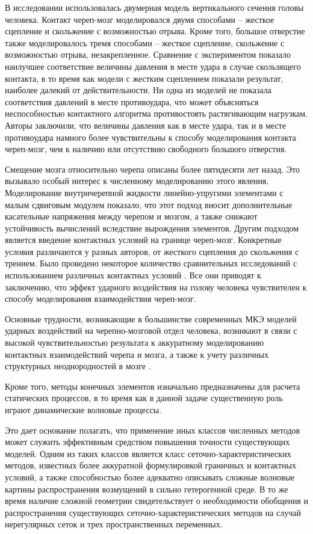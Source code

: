 В исследовании \cite{kuijpers} использовалась двумерная модель вертикального сечения головы человека. Контакт череп-мозг моделировался двумя способами -- жесткое сцепление и скольжение с возможностью отрыва. Кроме того, большое отверстие также моделировалось тремя способами -- жесткое сцепление, скольжение с возможностью отрыва, незакрепленное. Сравнение с экспериментом показало наилучшее соответствие величины давления в месте удара в случае скользящего контакта, в то время как модели с жестким сцеплением показали результат, наиболее далекий от действительности. Ни одна из моделей не показала соответствия давлений в месте противоудара, что может объясняться неспособностью контактного алгоритма противостоять растягивающим нагрузкам. Авторы заключили, что величины давления как в месте удара, так и в месте противоудара намного более чувствительны к способу моделирования контакта череп-мозг, чем к наличию или отсутствию свободного большого отверстия. 

Смещение мозга относительно черепа описаны более пятидесяти лет назад. Это вызывало особый интерес к численному моделированию этого явления. Моделирование внутричерепной жидкости линейно-упругими элементами с малым сдвиговым модулем \cite{zhou} показало, что этот подход вносит дополнительные касательные напряжения между черепом и мозгом, а также снижают устойчивость вычислений вследствие вырождения элементов. Другим подходом является введение контактных условий на границе череп-мозг. Конкретные условия различаются у разных авторов, от жесткого сцепления до скольжения с трением. Было проведено некоторое количество сравнительных исследований с использованием различных контактных условий \cite{claessens}. Все они приводят к заключению, что эффект ударного воздействия на голову человека чувствителен к способу моделирования взаимодействия череп-мозг. 

Основные трудности, возникающие в большинстве современных МКЭ моделей ударных воздействий на черепно-мозговой отдел человека, возникают в связи с высокой чувствительностью результата к аккуратному моделированию контактных взаимодействий черепа и мозга, а также к учету различных структурных неоднородностей в мозге \cite{agapov_2005}.

Кроме того, методы конечных элементов изначально предназначены для расчета статических процессов, в то время как в данной задаче существенную роль играют динамические волновые процессы.

Это дает основание полагать, что применение иных классов численных методов может служить эффективным средством повышения точности существующих моделей. Одним из таких классов является класс сеточно-характеристических методов, известных более аккуратной формулировкой граничных и контактных условий, а также способностью более адекватно описывать сложные волновые картины распространения возмущений в сильно гетерогенной среде. В то же время наличие сложной геометрии свидетельствует о необходимости обобщения и распространения существующих сеточно-характеристических методов на случай нерегулярных сеток и трех пространственных переменных.

